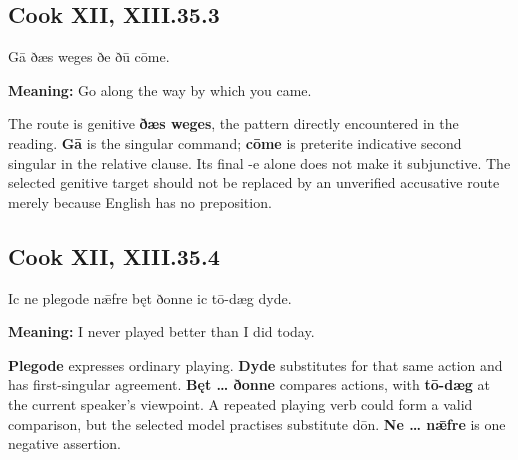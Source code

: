 \par\begin{minipage}{\linewidth}\raggedright
\subsection*{Cook XII, XIII.35.3}

Gā ðæs weges ðe ðū cōme.

\textbf{Meaning:} Go along the way by which you came.

The route is genitive \textbf{ðæs weges}, the pattern directly encountered in the reading. \textbf{Gā} is the singular command; \textbf{cōme} is preterite indicative second singular in the relative clause. Its final -e alone does not make it subjunctive. The selected genitive target should not be replaced by an unverified accusative route merely because English has no preposition.

\end{minipage}\par\addvspace{4pt}

\par\begin{minipage}{\linewidth}\raggedright
\subsection*{Cook XII, XIII.35.4}

Ic ne plegode nǣfre bęt ðonne ic tō-dæg dyde.

\textbf{Meaning:} I never played better than I did today.

\textbf{Plegode} expresses ordinary playing. \textbf{Dyde} substitutes for that same action and has first-singular agreement. \textbf{Bęt … ðonne} compares actions, with \textbf{tō-dæg} at the current speaker’s viewpoint. A repeated playing verb could form a valid comparison, but the selected model practises substitute dōn. \textbf{Ne … nǣfre} is one negative assertion.

\end{minipage}\par\addvspace{4pt}

